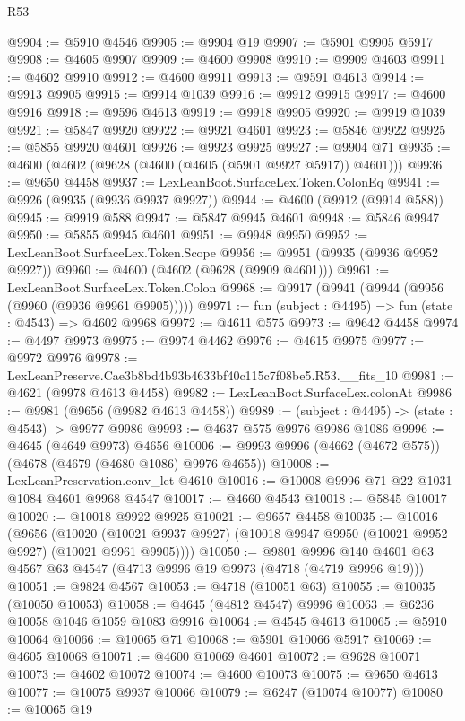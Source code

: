\begin{lexlean}{R53}
\begin{coremodule}
@9904 := @5910 @4546
@9905 := @9904 @19
@9907 := @5901 @9905 @5917
@9908 := @4605 @9907
@9909 := @4600 @9908
@9910 := @9909 @4603
@9911 := @4602 @9910
@9912 := @4600 @9911
@9913 := @9591 @4613
@9914 := @9913 @9905
@9915 := @9914 @1039
@9916 := @9912 @9915
@9917 := @4600 @9916
@9918 := @9596 @4613
@9919 := @9918 @9905
@9920 := @9919 @1039
@9921 := @5847 @9920
@9922 := @9921 @4601
@9923 := @5846 @9922
@9925 := @5855 @9920 @4601
@9926 := @9923 @9925
@9927 := @9904 @71
@9935 := @4600 (@4602 (@9628 (@4600 (@4605 (@5901 @9927 @5917)) @4601)))
@9936 := @9650 @4458
@9937 := LexLeanBoot.SurfaceLex.Token.ColonEq
@9941 := @9926 (@9935 (@9936 @9937 @9927))
@9944 := @4600 (@9912 (@9914 @588))
@9945 := @9919 @588
@9947 := @5847 @9945 @4601
@9948 := @5846 @9947
@9950 := @5855 @9945 @4601
@9951 := @9948 @9950
@9952 := LexLeanBoot.SurfaceLex.Token.Scope
@9956 := @9951 (@9935 (@9936 @9952 @9927))
@9960 := @4600 (@4602 (@9628 (@9909 @4601)))
@9961 := LexLeanBoot.SurfaceLex.Token.Colon
@9968 := @9917 (@9941 (@9944 (@9956 (@9960 (@9936 @9961 @9905)))))
@9971 := fun (subject : @4495) => fun (state : @4543) => @4602 @9968
@9972 := @4611 @575
@9973 := @9642 @4458
@9974 := @4497 @9973
@9975 := @9974 @4462
@9976 := @4615 @9975
@9977 := @9972 @9976
@9978 := LexLeanPreserve.Cae3b8bd4b93b4633bf40c115c7f08be5.R53.__fits_10
@9981 := @4621 (@9978 @4613 @4458)
@9982 := LexLeanBoot.SurfaceLex.colonAt
@9986 := @9981 (@9656 (@9982 @4613 @4458))
@9989 := (subject : @4495) -> (state : @4543) -> @9977 @9986
@9993 := @4637 @575 @9976 @9986 @1086
@9996 := @4645 (@4649 @9973) @4656
@10006 := @9993 @9996 (@4662 (@4672 @575)) (@4678 (@4679 (@4680 @1086) @9976 @4655))
@10008 := LexLeanPreservation.conv_let @4610
@10016 := @10008 @9996 @71 @22 @1031 @1084 @4601 @9968 @4547
@10017 := @4660 @4543
@10018 := @5845 @10017
@10020 := @10018 @9922 @9925
@10021 := @9657 @4458
@10035 := @10016
    (@9656
      (@10020 (@10021 @9937 @9927) (@10018 @9947 @9950 (@10021 @9952 @9927) (@10021 @9961 @9905))))
@10050 := @9801
    @9996
    @140
    @4601
    @63
    @4567
    @63
    @4547
    (@4713 @9996 @19 @9973 (@4718 (@4719 @9996 @19)))
@10051 := @9824 @4567
@10053 := @4718 (@10051 @63)
@10055 := @10035 (@10050 @10053)
@10058 := @4645 (@4812 @4547) @9996
@10063 := @6236 @10058 @1046 @1059 @1083 @9916
@10064 := @4545 @4613
@10065 := @5910 @10064
@10066 := @10065 @71
@10068 := @5901 @10066 @5917
@10069 := @4605 @10068
@10071 := @4600 @10069 @4601
@10072 := @9628 @10071
@10073 := @4602 @10072
@10074 := @4600 @10073
@10075 := @9650 @4613
@10077 := @10075 @9937 @10066
@10079 := @6247 (@10074 @10077)
@10080 := @10065 @19

\end{coremodule}
\end{lexlean}
